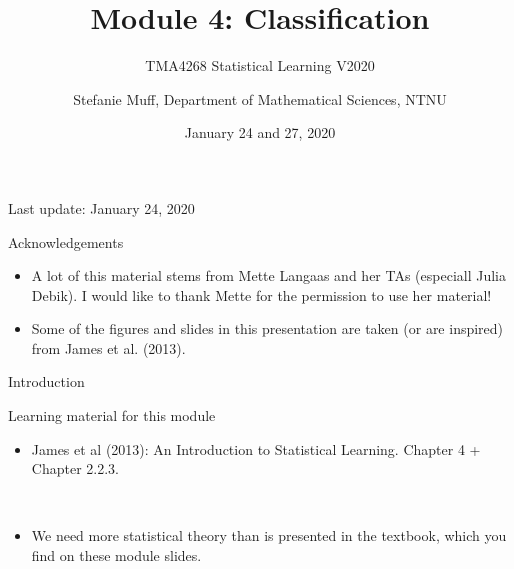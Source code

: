 \documentclass[10pt,ignorenonframetext,]{beamer}
\title{Module 4: Classification}
\subtitle{TMA4268 Statistical Learning V2020}
\author{Stefanie Muff, Department of Mathematical Sciences, NTNU}
\date{January 24 and 27, 2020}
\providecommand{\tightlist}{%
  \setlength{\itemsep}{0pt}\setlength{\parskip}{0pt}}
\begin{document}
\frame{\titlepage}

\begin{frame}

Last update: January 24, 2020

\end{frame}

\begin{frame}{Acknowledgements}

\begin{itemize}
\item
  A lot of this material stems from Mette Langaas and her TAs (especiall
  Julia Debik). I would like to thank Mette for the permission to use
  her material!
\item
  Some of the figures and slides in this presentation are taken (or are
  inspired) from James et al. (2013).
\end{itemize}

\end{frame}

\begin{frame}{Introduction}

\begin{block}{Learning material for this module}

\vspace{2mm}

\begin{itemize}
\tightlist
\item
  James et al (2013): An Introduction to Statistical Learning. Chapter 4
  + Chapter 2.2.3.
\end{itemize}

\(~\)

\begin{itemize}
\tightlist
\item
  We need more statistical theory than is presented in the textbook,
  which you find on these module slides.
\end{itemize}

\end{block}

\end{frame}
\end{document}
